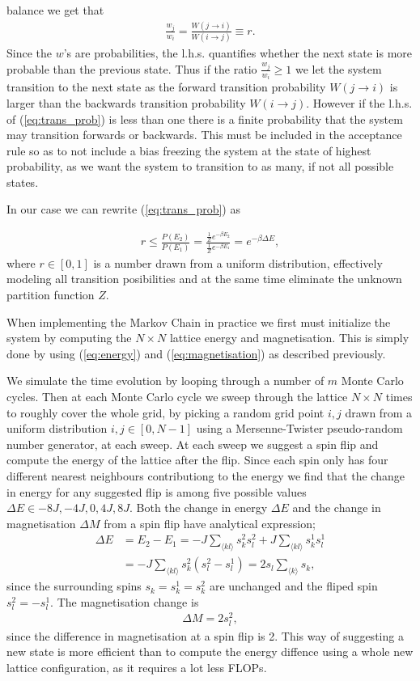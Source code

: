\documentclass[twocolumn]{aastex62}
\begin{document}
balance we get that 
\begin{align}
	\frac{w_j}{w_i} = \frac{W(j \to i)}{W(i \to j)} \equiv r.
	\label{eq:trans_prob}
\end{align}
Since the $w$'s are probabilities, the l.h.s. quantifies whether the next state
is more probable than the previous state. Thus if the ratio
$\frac{w_j}{w_i}\geq 1$ we let the system transition to the next state as the
forward transition probability $W(j \to i)$ is larger than the backwards
transition probability $W(i \to j)$. However if the l.h.s. of
(\ref{eq:trans_prob}) is less than one there is a finite probability that the
system may transition forwards or backwards. This must be included in the acceptance rule so as
to not include a bias freezing the system at the state of highest probability,
as we want the system to transition to as many, if not all possible states.

In our case we can rewrite (\ref{eq:trans_prob}) as 

\begin{align}
	r \leq \frac{P(E_2)}{P(E_1)} = \frac{\frac{1}{Z}e^{-\beta E_2}}{\frac{1}{Z}e^{-\beta E_1}} = e^{-\beta\Delta E}, 
\end{align}
where $r\in[0, 1]$ is a number drawn from a uniform distribution, effectively
modeling all transition posibilities and at the same time eliminate the unknown
partition function $Z$. 

When implementing the Markov Chain in practice we first must initialize the
system by computing the $N\times N$ lattice energy and magnetisation.
This is simply done by using (\ref{eq:energy}) and (\ref{eq:magnetisation}) as
described previously.

We simulate the time evolution by looping through a number of $m$ Monte Carlo
cycles. Then at each Monte Carlo cycle we sweep through the lattice $N\times N$
times to roughly cover the whole grid, by picking a random grid point $i, j$
drawn from a uniform distribution $i,j\in[0, N-1]$ using a Mersenne-Twister
pseudo-random number generator, at each sweep. At each sweep we
suggest a spin flip and compute the energy of the lattice after the flip. Since each spin only has four different nearest neighbours
contributiong
to
the energy we find that the change in energy for any suggested flip is among
five possible values $\Delta E \in {-8J, -4J, 0, 4J, 8J}$. Both the change in
energy $\Delta E$ and the change in magnetisation $\Delta M$ from a spin flip have analytical
expression;
\begin{align}
	\Delta E &= E_2 - E_1 = -J\sum_{\langle kl\rangle}s_k^2s_l^2 + J\sum_{\langle kl\rangle}s_k^1s_l^1 \\
	&= -J\sum_{\langle kl\rangle}s_k^2(s_l^2-s_l^1) = 2s_l\sum_{\langle k\rangle} s_k,
\end{align}
since the surrounding spins $s_k = s_k^1 = s_k^2$ are unchanged and the fliped
spin $s_l^2 = -s_l^1$. The magnetisation change is 
\begin{align}
	\Delta M = 2s_l^2,
\end{align}
since the difference in magnetisation at a spin flip is 2. This way of
suggesting a new state is more efficient than to compute the energy diffence
using a whole new lattice configuration, as it requires a lot less FLOPs.
\end{document}
